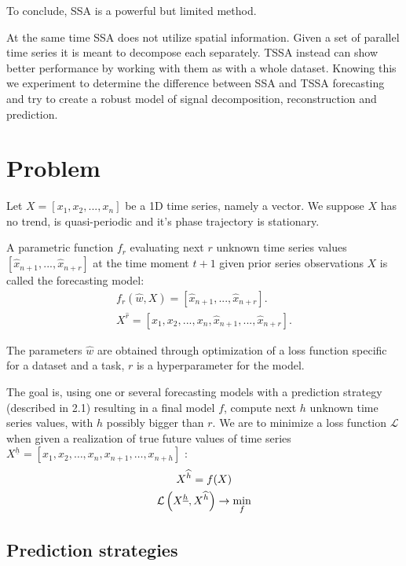 \documentclass{article}
\begin{document}
To conclude, SSA is a powerful but limited method.

At the same time SSA does not utilize spatial information. Given a set of parallel time series it is meant to decompose each separately. TSSA instead can show better performance by working with them as with a whole dataset. Knowing this we experiment to determine the difference between SSA and TSSA forecasting and try to create a robust model of signal decomposition, reconstruction and prediction.
\section{Problem}
\label{sec:Problem}

Let \(X = \left[x_1, x_2, ..., x_n\right]\) be a 1D time series, namely a vector. We suppose \(X\) has no trend, is quasi-periodic and it's phase trajectory is stationary.

A parametric function \(f_r\) evaluating next \(r\) unknown time series values \([\widehat{x}_{n+1}, ..., \widehat{x}_{n+r}]\) at the time moment \(t + 1\) given prior series observations \(X\) is called the forecasting model:
\begin{gather}
	f_r(\widehat{w}, X) = \left[\widehat{x}_{n+1}, ..., \widehat{x}_{n+r}\right]. \\
	X^{\widehat{r}} = \left[x_1, x_2, ..., x_n, \widehat{x}_{n+1}, ..., \widehat{x}_{n+r}\right].
\end{gather}

The parameters \(\widehat{w}\) are obtained through optimization of a loss function specific for a dataset and a task, \(r\) is a hyperparameter for the model.

The goal is, using one or several forecasting models with a prediction strategy (described in 2.1) resulting in a final model \(f\), compute next \(h\) unknown time series values, with \(h\) possibly bigger than \(r\). We are to minimize a loss function \(\mathcal{L}\) when given a realization of true future values of time series \(X^{\underline{h}} = \left[ x_1, x_2, \dots, x_n, x_{n+1}, \dots, x_{n+h} \right]\) :
\begin{gather}
	X^{\widehat{h}} = f(X) \notag \\
	\mathcal{L}\left( X^{\underline{h}}, X^{\widehat{h}} \right) \rightarrow \min_f
\end{gather}

\subsection{Prediction strategies}
\end{document}
